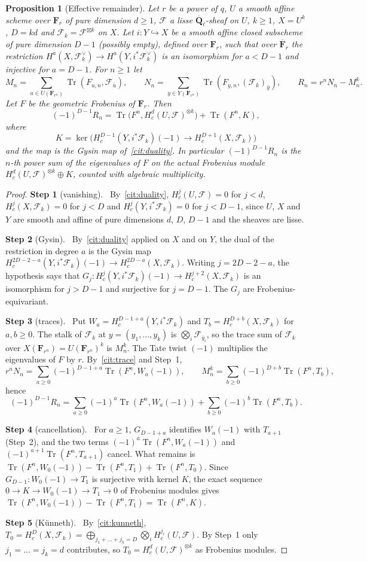 \documentclass[11pt,a4paper]{article}
\theoremstyle{plain}
\newtheorem{proposition}[theorem]{Proposition}
\theoremstyle{definition}
\theoremstyle{remark}
\newcommand{\step}[2]{\par\smallskip\noindent\textbf{Step #1} (#2).\ \ignorespaces}
\newcommand{\Ql}{\overline{\mathbf Q}_\ell}
\newcommand{\F}{\mathcal F}
\newcommand{\Tr}{\operatorname{Tr}}
\begin{document}
\begin{proposition}[Effective remainder]\label{prop:remainder}
Let $r$ be a power of $q$, $U$ a smooth affine scheme over $\mathbf F_r$ of pure dimension $d\ge1$, $\F$ a lisse
$\Ql$-sheaf on $U$, $k\ge1$, $X=U^k$, $D=kd$ and $\F_k=\F^{\boxtimes k}$ on $X$. Let $i:Y\hookrightarrow X$ be a smooth
affine closed subscheme of pure dimension $D-1$ (possibly empty), defined over $\mathbf F_r$, such that over
$\overline{\mathbf F}_r$ the restriction $H^a(X,\F_k^\vee)\to H^a(Y,i^*\F_k^\vee)$ is an isomorphism for $a<D-1$ and
injective for $a=D-1$. For $n\ge1$ let
\[
M_n=\sum_{u\in U(\mathbf F_{r^n})}\Tr(F_{u,n},\F_{\bar u}),\qquad
N_n=\sum_{y\in Y(\mathbf F_{r^n})}\Tr(F_{y,n},(\F_k)_{\bar y}),\qquad R_n=r^nN_n-M_n^k.
\]
Let $F$ be the geometric Frobenius of $\mathbf F_r$. Then
\[
(-1)^{D-1}R_n=\Tr\bigl(F^n,H^d_c(U,\F)^{\otimes k}\bigr)+\Tr(F^n,K),
\]
where
\[
K=\ker\bigl(H^{D-1}_c(Y,i^*\F_k)(-1)\to H^{D+1}_c(X,\F_k)\bigr)
\]
and the map is the Gysin map of~\ref{cit:duality}. In particular $(-1)^{D-1}R_n$ is the $n$-th power sum of the
eigenvalues of $F$ on the actual Frobenius module $H^d_c(U,\F)^{\otimes k}\oplus K$, counted with algebraic multiplicity.
\end{proposition}
\begin{proof}
\step{1}{vanishing} By~\ref{cit:duality}, $H^j_c(U,\F)=0$ for $j<d$, $H^j_c(X,\F_k)=0$ for $j<D$ and
$H^j_c(Y,i^*\F_k)=0$ for $j<D-1$, since $U$, $X$ and $Y$ are smooth and affine of pure dimensions $d$, $D$, $D-1$ and the
sheaves are lisse.

\step{2}{Gysin} By~\ref{cit:duality} applied on $X$ and on $Y$, the dual of the restriction in degree $a$ is the Gysin map
$H^{2D-2-a}_c(Y,i^*\F_k)(-1)\to H^{2D-a}_c(X,\F_k)$. Writing $j=2D-2-a$, the hypothesis says that
$G_j:H^j_c(Y,i^*\F_k)(-1)\to H^{j+2}_c(X,\F_k)$ is an isomorphism for $j>D-1$ and surjective for $j=D-1$. The $G_j$ are
Frobenius-equivariant.

\step{3}{traces} Put $W_a=H^{D-1+a}_c(Y,i^*\F_k)$ and $T_b=H^{D+b}_c(X,\F_k)$ for $a,b\ge0$. The stalk of $\F_k$ at
$y=(y_1,\dots,y_k)$ is $\bigotimes_i\F_{\bar y_i}$, so the trace sum of $\F_k$ over $X(\mathbf F_{r^n})=U(\mathbf F_{r^n})^k$
is $M_n^k$. The Tate twist $(-1)$ multiplies the eigenvalues of $F$ by $r$. By~\ref{cit:trace} and Step~1,
\[
r^nN_n=\sum_{a\ge0}(-1)^{D-1+a}\Tr(F^n,W_a(-1)),\qquad M_n^k=\sum_{b\ge0}(-1)^{D+b}\Tr(F^n,T_b),
\]
hence
\[
(-1)^{D-1}R_n=\sum_{a\ge0}(-1)^a\Tr(F^n,W_a(-1))+\sum_{b\ge0}(-1)^b\Tr(F^n,T_b).
\]

\step{4}{cancellation} For $a\ge1$, $G_{D-1+a}$ identifies $W_a(-1)$ with $T_{a+1}$ (Step~2), and the two terms
$(-1)^a\Tr(F^n,W_a(-1))$ and $(-1)^{a+1}\Tr(F^n,T_{a+1})$ cancel. What remains is
$\Tr(F^n,W_0(-1))-\Tr(F^n,T_1)+\Tr(F^n,T_0)$. Since $G_{D-1}:W_0(-1)\to T_1$ is surjective with kernel $K$, the exact
sequence $0\to K\to W_0(-1)\to T_1\to0$ of Frobenius modules gives $\Tr(F^n,W_0(-1))-\Tr(F^n,T_1)=\Tr(F^n,K)$.

\step{5}{K\"unneth} By~\ref{cit:kunneth}, $T_0=H^D_c(X,\F_k)=\bigoplus_{j_1+\dots+j_k=D}\bigotimes_iH^{j_i}_c(U,\F)$. By
Step~1 only $j_1=\dots=j_k=d$ contributes, so $T_0=H^d_c(U,\F)^{\otimes k}$ as Frobenius modules.
\end{proof}
\end{document}
